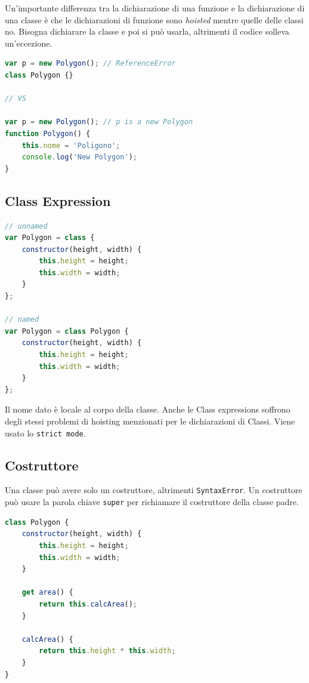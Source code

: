 Un'importante differenza tra la dichiarazione di una funzione e la dichiarazione di una classe è che le dichiarazioni di funzione sono \textit{hoisted} mentre quelle delle classi no. Bisogna dichiarare la classe e poi si può usarla, altrimenti il codice solleva un'eccezione.

\begin{lstlisting}[language=JavaScript]
var p = new Polygon(); // ReferenceError
class Polygon {}

// VS

var p = new Polygon(); // p is a new Polygon
function Polygon() {
    this.nome = 'Poligono';
    console.log('New Polygon');
}
\end{lstlisting}

\subsection{Class Expression}

\begin{lstlisting}[language=JavaScript]
// unnamed
var Polygon = class {
    constructor(height, width) {
        this.height = height;
        this.width = width;
    }
};

// named
var Polygon = class Polygon {
    constructor(height, width) {
        this.height = height;
        this.width = width;
    }
};
\end{lstlisting}

Il nome dato è locale al corpo della classe. Anche le Class expressions soffrono degli stessi problemi di hoisting menzionati per le dichiarazioni di Classi. Viene usato lo \texttt{strict mode}.

\subsection{Costruttore}

Una classe può avere solo un costruttore, altrimenti \texttt{SyntaxError}. Un costruttore può usare la parola chiave \texttt{super} per richiamare il costruttore della classe padre.

\begin{lstlisting}[language=JavaScript, caption=Metodi prototipo]
class Polygon {
    constructor(height, width) {
        this.height = height;
        this.width = width;
    }

    get area() {
        return this.calcArea();
    }

    calcArea() {
        return this.height * this.width;
    }
}
\end{lstlisting}

